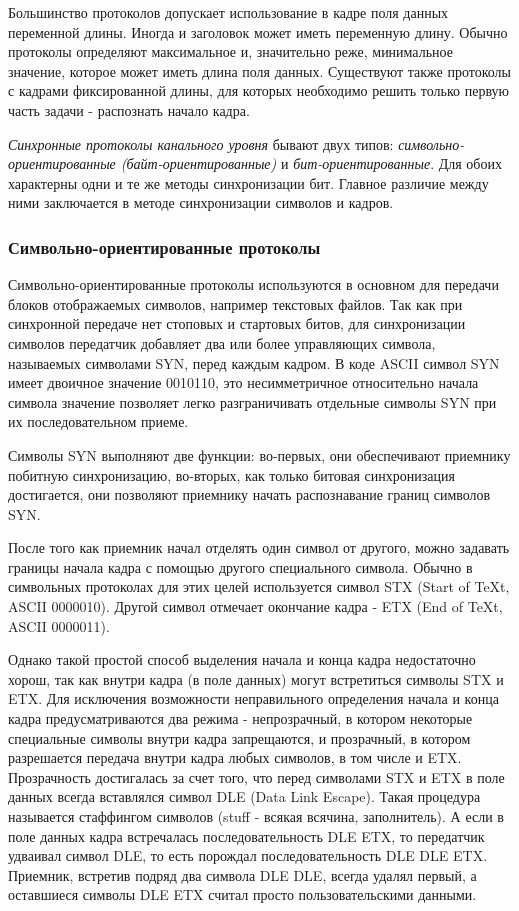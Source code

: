 Большинство протоколов допускает использование в кадре поля данных переменной длины.
Иногда и заголовок может иметь переменную длину.
Обычно протоколы определяют максимальное и, значительно реже, минимальное значение, которое может иметь длина поля данных.
Существуют также протоколы с кадрами фиксированной длины, для которых необходимо решить только первую часть задачи - распознать начало кадра.

\emph{Синхронные протоколы канального уровня} бывают двух типов: \emph{символьно-ориентированные (байт-ориентированные)} и \emph{бит-ориентированные}.
Для обоих характерны одни и те же методы синхронизации бит.
Главное различие между ними заключается в методе синхронизации символов и кадров.

\subsubsection{Символьно-ориентированные протоколы}

Символьно-ориентированные протоколы используются в основном для передачи блоков отображаемых символов, например текстовых файлов.
Так как при синхронной передаче нет стоповых и стартовых битов, для синхронизации символов  передатчик добавляет два или более управляющих символа, называемых символами SYN, перед каждым кадром.
В коде ASCII символ SYN имеет двоичное значение 0010110, это несимметричное относительно начала символа значение позволяет легко разграничивать отдельные символы SYN при их последовательном приеме.

Символы SYN выполняют две функции: во-первых, они обеспечивают приемнику побитную синхронизацию, во-вторых, как только битовая синхронизация достигается, они позволяют приемнику начать распознавание границ символов SYN.

После того как приемник начал отделять один символ от другого, можно задавать границы начала кадра с помощью другого специального символа.
Обычно в символьных протоколах для этих целей используется символ STX (Start of TeXt, ASCII 0000010).
Другой символ отмечает окончание кадра - ETX (End of TeXt, ASCII 0000011).

Однако такой простой способ выделения начала и конца кадра недостаточно хорош, так как внутри кадра (в поле данных) могут встретиться символы STX и ETX.
Для исключения возможности неправильного определения начала и конца кадра предусматриваются два режима - непрозрачный, в котором некоторые специальные символы внутри кадра запрещаются, и прозрачный, в котором разрешается передача внутри кадра любых символов, в том числе и ETX.
Прозрачность достигалась за счет того, что перед символами STX и ETX в поле данных всегда вставлялся символ DLE (Data Link Escape).
Такая процедура называется стаффингом символов (stuff - всякая всячина, заполнитель).
А если в поле данных кадра встречалась последовательность DLE ETX, то передатчик удваивал символ DLE, то есть порождал последовательность DLE DLE ETX.
Приемник, встретив подряд два символа DLE DLE, всегда удалял первый, а оставшиеся символы DLE ETX считал просто пользовательскими данными.

